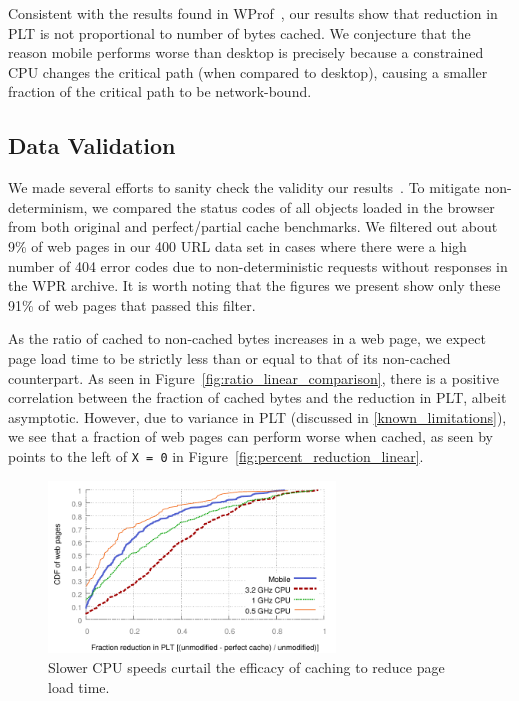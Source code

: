 Consistent with the results found in WProf~\cite{wang2013demystifying}, our results show that reduction in PLT is not proportional to number of bytes cached. We conjecture that the reason mobile performs worse than desktop is precisely because a constrained CPU changes the critical path (when compared to desktop), causing a smaller fraction of the critical path to be network-bound. 


\subsection{Data Validation}
\label{subsec:validation}
We made several efforts to sanity check the validity our results~\cite{sanity-checks}. To mitigate non-determinism, we compared the status codes of all objects loaded in the browser from both original and perfect/partial cache benchmarks. We filtered out about 9\% of web pages in our 400 URL data set in cases where there were a high number of 404 error codes due to non-deterministic requests without responses in the WPR archive. It is worth noting that the figures we present show only these 91\% of web pages that passed this filter.

As the ratio of cached to non-cached bytes increases in a web page, we expect page load time to be strictly less than or equal to that of its non-cached counterpart. As seen in Figure~\ref{fig:ratio_linear_comparison}, there is a positive correlation between the fraction of cached bytes and the reduction in PLT, albeit asymptotic.
However, due to variance in PLT (discussed in \ref{known_limitations}), we see that a fraction of web pages can perform worse when cached, as seen by points to the left of \texttt{X = 0} in Figure~\ref{fig:percent_reduction_linear}.



\begin{figure}[t]
    \includegraphics[width=3in]{../graphs/percent_plt_reduction/percent_reduction_linear_CPU_comparison.pdf}
    \caption[]{\label{fig:plt_cpu_comparison}Slower CPU speeds curtail the efficacy of caching to reduce page load time.}
\end{figure}
